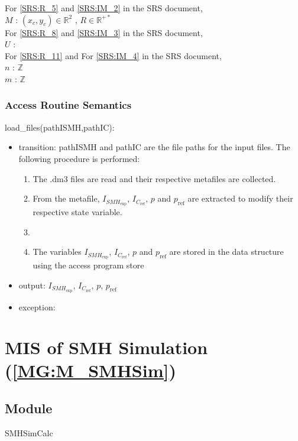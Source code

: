 \documentclass[12pt, titlepage]{article}
\begin{document}
\noindent For \cref{SRS:R_5} and \cref{SRS:IM_2} in the SRS document,\\
\noindent$M$ : $(x_c,y_c) \in \mathbb{R}^2$ , $R \in \mathbb{R}^{+*}$\\

\noindent For \cref{SRS:R_8} and \cref{SRS:IM_3} in the SRS document,\\
\noindent$U$ :\\ 

\noindent For \cref{SRS:R_11} and For \cref{SRS:IM_4} in the SRS document,\\
\noindent$n$ : $\mathbb{Z}$\\
$m$ : $\mathbb{Z}$\\

\subsubsection{Access Routine Semantics}

\noindent load{\_}files(pathISMH,pathIC):
\begin{itemize}
\item transition: pathISMH and pathIC are the file paths for the input files. The following procedure is performed:
\begin{enumerate}
\item The .dm3 files are read and their respective  metafiles are collected.
\item From the metafile, $I_{\mathit{SMH}_{\text{exp}}}$, $I_{C_{\text{ref}}}$, $p$ and $p_{\text{ref}}$ are extracted to modify their respective state variable.
\item 
\item The variables $I_{\mathit{SMH}_{\text{exp}}}$, $I_{C_{\text{ref}}}$, $p$ and $p_{\text{ref}}$ are stored in the data structure using the access program store 
\end{enumerate}  
\item output:  $I_{\mathit{SMH}_{\text{exp}}}$, $I_{C_{\text{ref}}}$, $p$, $p_{\text{ref}}$ 
\item exception:  
\end{itemize}

\section{MIS of SMH Simulation (\texorpdfstring{\cref{MG:M_SMHSim}}))} \label{MIS_SHMSim}

\subsection{Module}
SMHSimCalc
\end{document}
